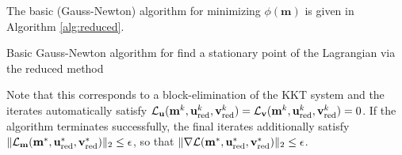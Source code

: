 \documentclass{iopart}
\begin{document}
The basic (Gauss-Newton) algorithm for minimizing $\phi(\mathbf{m})$ is given in 
Algorithm \ref{alg:reduced}.
\begin{algorithm}
\caption{Basic Gauss-Newton algorithm for find a stationary point of the Lagrangian via the reduced method}
\label{alg:reduced}
\begin{algorithmic}
\ENDWHILE
\end{algorithmic}
\end{algorithm}
Note that this corresponds to a block-elimination of the KKT system and the iterates automatically
satisfy $\mathcal{L}_{\mathbf{u}}(\mathbf{m}^k,\mathbf{u}^k_{\mathrm{red}},\mathbf{v}^k_{\mathrm{red}}) = \mathcal{L}_{\mathbf{v}}(\mathbf{m}^k,\mathbf{u}^k_{\mathrm{red}},\mathbf{v}^k_{\mathrm{red}}) = 0$. 
If the algorithm terminates successfully, the final iterates additionally satisfy
$\|\mathcal{L}_{\mathbf{m}}(\mathbf{m}^*,\mathbf{u}^*_{\mathrm{red}},\mathbf{v}^*_{\mathrm{red}})\|_2 \leq \epsilon$, so that 
$\|\nabla\mathcal{L}(\mathbf{m}^*,\mathbf{u}^*_{\mathrm{red}},\mathbf{v}^*_{\mathrm{red}})\|_2\leq \epsilon$.
\end{document}
